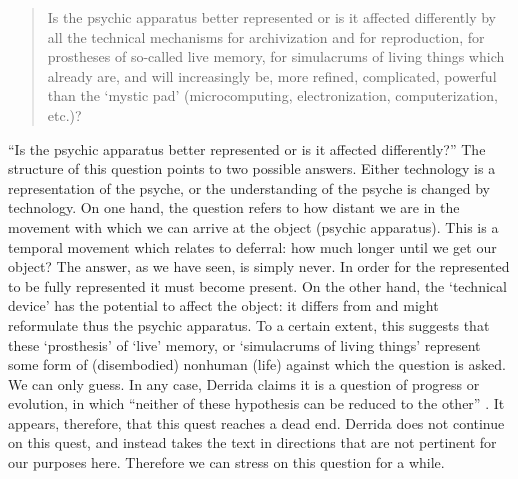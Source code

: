 \begin{quote}
	Is the psychic apparatus better represented or is it affected differently by all the technical mechanisms for archivization and for reproduction, for prostheses of so-called live memory, for simulacrums of living things which already are, and will increasingly be, more refined, complicated, powerful than the `mystic pad' (microcomputing, electronization, computerization, etc.)? \parencite[16]{Der95:Arc} 
\end{quote}


``Is the psychic apparatus better represented or is it affected differently?'' The structure of this question points to two possible answers. Either technology is a representation of the psyche, or the understanding of the psyche is changed by technology. On one hand, the question refers to how distant we are in the movement with which we can arrive at the object (psychic apparatus). This is a temporal movement which relates to deferral: how much longer until we get our object? The answer, as we have seen, is simply never. In order for the represented to be fully represented it must become present. On the other hand, the `technical device' has the potential to affect the object: it differs from and might reformulate thus the psychic apparatus. To a certain extent, this suggests that these `prosthesis' of `live' memory, or `simulacrums of living things' represent some form of (disembodied) nonhuman (life) against which the question is asked. We can only guess. In any case, Derrida claims it is a question of progress or evolution, in which ``neither of these hypothesis can be reduced to the other'' \parencite[16]{Der95:Arc}. It appears, therefore, that this quest reaches a dead end. Derrida does not continue on this quest, and instead takes the text in directions that are not pertinent for our purposes here. Therefore we can stress on this question for a while. 

